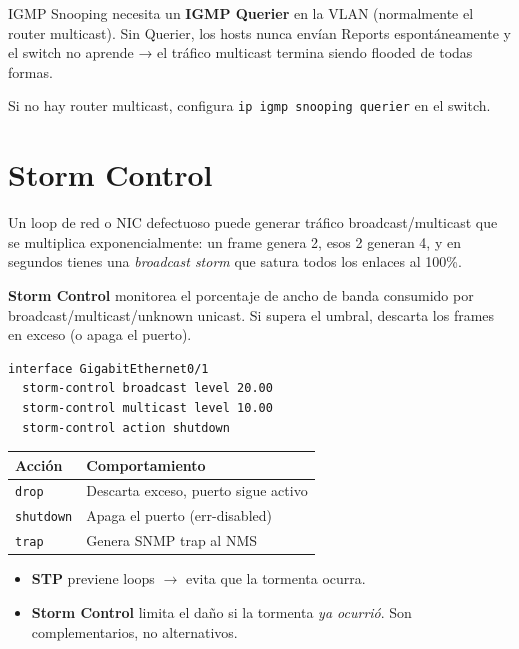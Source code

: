\begin{cuidado}
IGMP Snooping necesita un \textbf{IGMP Querier} en la VLAN (normalmente el router
multicast). Sin Querier, los hosts nunca envían Reports espontáneamente y el switch
no aprende → el tráfico multicast termina siendo flooded de todas formas.

Si no hay router multicast, configura \texttt{ip igmp snooping querier} en el switch.
\end{cuidado}

\section{ Storm Control}

\begin{concepto}
Un loop de red o NIC defectuoso puede generar tráfico broadcast/multicast que se multiplica
exponencialmente: un frame genera 2, esos 2 generan 4, y en segundos tienes una
\emph{broadcast storm} que satura todos los enlaces al 100\%.

\textbf{Storm Control} monitorea el porcentaje de ancho de banda consumido por
broadcast/multicast/unknown unicast. Si supera el umbral, descarta los frames en exceso
(o apaga el puerto).
\end{concepto}

\begin{codigo}
\begin{lstlisting}
interface GigabitEthernet0/1
  storm-control broadcast level 20.00
  storm-control multicast level 10.00
  storm-control action shutdown
\end{lstlisting}
\end{codigo}

\begin{center}
\begin{tabular}{ll}
\toprule
\textbf{Acción} & \textbf{Comportamiento} \\
\midrule
\texttt{drop}     & Descarta exceso, puerto sigue activo \\
\texttt{shutdown} & Apaga el puerto (err-disabled) \\
\texttt{trap}     & Genera SNMP trap al NMS \\
\bottomrule
\end{tabular}
\end{center}

\begin{itemize}
    \item \textbf{STP} previene loops $\to$ evita que la tormenta ocurra.
    \item \textbf{Storm Control} limita el daño si la tormenta \emph{ya ocurrió}.
    Son complementarios, no alternativos.
\end{itemize}

